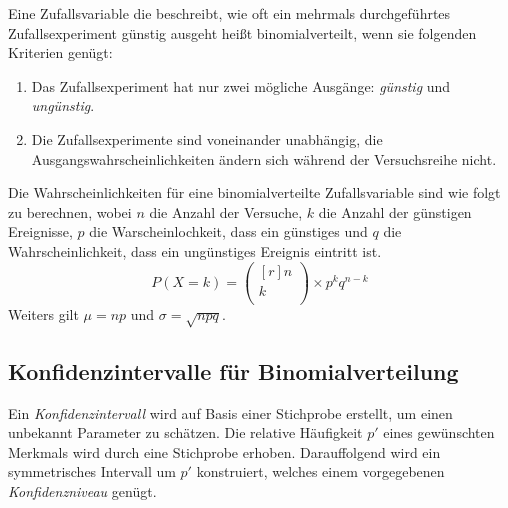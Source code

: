 \documentclass[twocolumn]{article}
\newcommand{\term}[1]{\emph{#1}}
\newcommand{\twodvector}[2]{\begin{pmatrix*}[r]#1 \\ #2 \\\end{pmatrix*}}
\begin{document}
Eine Zufallsvariable die beschreibt, wie oft ein mehrmals durchgeführtes Zufallsexperiment günstig ausgeht heißt binomialverteilt, wenn sie folgenden Kriterien genügt:

\begin{enumerate}
    \item Das Zufallsexperiment hat nur zwei mögliche Ausgänge: \emph{günstig} und \emph{ungünstig}.
    \item Die Zufallsexperimente sind voneinander unabhängig, die Ausgangs\-wahrschein\-lichkeiten ändern sich während der Versuchsreihe nicht.
\end{enumerate}

Die Wahrscheinlichkeiten für eine binomialverteilte Zufallsvariable sind wie folgt zu berechnen, wobei $n$ die Anzahl der Versuche, $k$ die Anzahl der günstigen Ereignisse, $p$ die Warscheinlochkeit, dass ein günstiges und $q$ die Wahrscheinlichkeit, dass ein ungünstiges Ereignis eintritt ist.
%
\begin{equation*}
    P(X = k) = \twodvector{n}{k} \times p^{k}q^{n - k}
\end{equation*}
%
Weiters gilt $\mu = np$ und $\sigma = \sqrt{npq}$.

\subsection{Konfidenzintervalle für Binomialverteilung}

Ein \term{Konfidenzintervall} wird auf Basis einer Stichprobe erstellt, um einen unbekannt Parameter zu schätzen. Die relative Häufigkeit $p'$ eines gewünschten Merkmals wird durch eine Stichprobe erhoben. Darauffolgend wird ein symmetrisches Intervall um $p'$ konstruiert, welches einem vorgegebenen \term{Konfidenzniveau} genügt.
\end{document}
